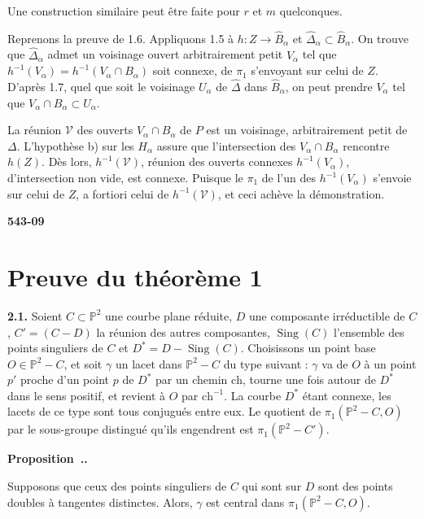 \documentclass[12pt,a4paper]{article}
\newcounter{secitem}
\renewcommand{\thesecitem}{\thesection.\arabic{secitem}}
\newenvironment{secproposition}{%
  \refstepcounter{secitem}%
  \par\medskip\noindent\textbf{Proposition~\thesecitem.}~\ignorespaces
}{\par\medskip}
\DeclareMathOperator{\Sing}{Sing}
\begin{document}
Une construction similaire peut être faite pour $r$ et $m$ quelconques.

Reprenons la preuve de 1.6. Appliquons 1.5 à $h : Z \to \widehat{B}_\alpha$ et $\widehat{\Delta}_\alpha \subset \widehat{B}_\alpha$. On trouve que $\widehat{\Delta}_\alpha$ admet un voisinage ouvert arbitrairement petit $V_\alpha$ tel que $h^{-1}(V_\alpha) = h^{-1}(V_\alpha \cap B_\alpha)$ soit connexe, de $\pi_1$ s'envoyant sur celui de $Z$. D'après 1.7, quel que soit le voisinage $U_\alpha$ de $\widehat{\Delta}$ dans $\widehat{B}_\alpha$, on peut prendre $V_\alpha$ tel que $V_\alpha \cap B_\alpha \subset U_\alpha$.

La réunion $\mathcal{V}$ des ouverts $V_\alpha \cap B_\alpha$ de $P$ est un voisinage, arbitrairement petit de $\Delta$. L'hypothèse b) sur les $H_\alpha$ assure que l'intersection des $V_\alpha \cap B_\alpha$ rencontre $h(Z)$. Dès lors, $h^{-1}(\mathcal{V})$, réunion des ouverts connexes $h^{-1}(V_\alpha)$, d'intersection non vide, est connexe. Puisque le $\pi_1$ de l'un des $h^{-1}(V_\alpha)$ s'envoie sur celui de $Z$, a fortiori celui de $h^{-1}(\mathcal{V})$, et ceci achève la démonstration.

\newpage
\begin{flushright}
\textbf{543-09}
\end{flushright}

\section{Preuve du théorème 1}
\setcounter{secitem}{0}

\textbf{2.1.} Soient $C \subset \mathbb{P}^2$ une courbe plane réduite, $D$ une composante irréductible de $C$, $C' = (C - D)$ la réunion des autres composantes, $\Sing(C)$ l'ensemble des points singuliers de $C$ et $D^* = D - \Sing(C)$. Choisissons un point base $O \in \mathbb{P}^2 - C$, et soit $\gamma$ un lacet dans $\mathbb{P}^2 - C$ du type suivant : $\gamma$ va de $O$ à un point $p'$ proche d'un point $p$ de $D^*$ par un chemin $\mathrm{ch}$, tourne une fois autour de $D^*$ dans le sens positif, et revient à $O$ par $\mathrm{ch}^{-1}$. La courbe $D^*$ étant connexe, les lacets de ce type sont tous conjugués entre eux. Le quotient de $\pi_1(\mathbb{P}^2 - C, O)$ par le sous-groupe distingué qu'ils engendrent est $\pi_1(\mathbb{P}^2 - C')$.

\setcounter{secitem}{1}
\begin{secproposition}
Supposons que ceux des points singuliers de $C$ qui sont sur $D$ sont des points doubles à tangentes distinctes. Alors, $\gamma$ est central dans $\pi_1(\mathbb{P}^2 - C, O)$.
\end{secproposition}
\end{document}
